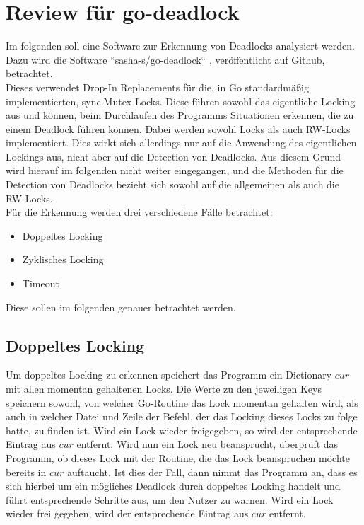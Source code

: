 \chapter{Review für go-deadlock}\label{Chap::Review:go-deadlock}
Im folgenden soll eine Software zur Erkennung von Deadlocks analysiert werden.
Dazu wird die Software ``sasha-s/go-deadlock`` \cite{sasha-s}, veröffentlicht 
auf Github, betrachtet.\\
Dieses verwendet Drop-In Replacements für die, in Go standardmäßig 
implementierten, sync.Mutex Locks. Diese führen sowohl das eigentliche 
Locking aus und können, beim Durchlaufen des Programms Situationen erkennen, 
die zu einem Deadlock führen können. Dabei werden sowohl Locks
als auch RW-Locks implementiert. Dies wirkt sich allerdings nur auf
die Anwendung des eigentlichen Lockings aus, nicht aber auf die Detection von 
Deadlocks. Aus diesem Grund wird hierauf im folgenden nicht weiter eingegangen, 
und die Methoden für die Detection von Deadlocks bezieht sich sowohl auf die
allgemeinen als auch die RW-Locks.\\
Für die Erkennung werden drei verschiedene Fälle betrachtet:
\begin{itemize}
    \item Doppeltes Locking
    \item Zyklisches Locking
    \item Timeout
\end{itemize}
Diese sollen im folgenden genauer betrachtet werden.

\section{Doppeltes Locking}\label{Kap::Rev:Recursive}
Um doppeltes Locking zu erkennen speichert das Programm ein Dictionary $cur$ mit 
allen momentan gehaltenen 
Locks. Die Werte zu den jeweiligen Keys speichern sowohl, von welcher Go-Routine das 
Lock momentan gehalten wird, als auch in welcher Datei und Zeile der Befehl,
der das Locking dieses Locks zu folge hatte, zu finden ist. Wird ein Lock 
wieder freigegeben, so wird der entsprechende Eintrag aus $cur$ entfernt. 
Wird nun ein Lock neu beansprucht, überprüft 
das Programm, ob dieses Lock mit der Routine, die das Lock beanspruchen möchte 
bereits in $cur$ auftaucht. Ist dies der Fall, dann nimmt das
Programm an, dass es sich hierbei um ein mögliches Deadlock durch doppeltes Locking
handelt und führt 
entsprechende Schritte aus, um den Nutzer zu warnen. Wird ein Lock wieder frei
gegeben, wird der entsprechende Eintrag aus $cur$ entfernt.

